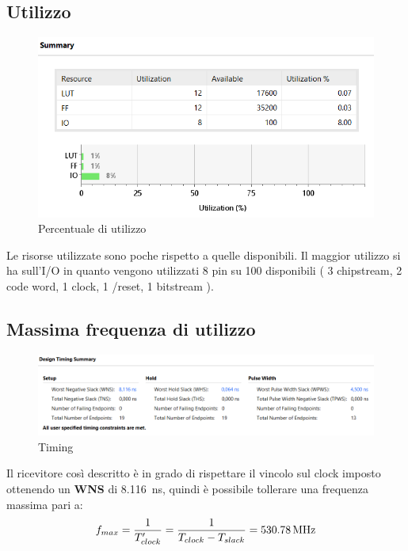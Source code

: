 \documentclass[a4paper,12pt]{article}
\begin{document}
  \subsection{Utilizzo}
    \begin{figure}[H]
      \centering
      \includegraphics[width=\textwidth]{img/Utilizzo.png}
      \caption{Percentuale di utilizzo}
      \label{fig:utilizzo}
    \end{figure}
    Le risorse utilizzate sono poche rispetto a quelle disponibili. Il maggior utilizzo si ha sull'I/O in quanto vengono 
    utilizzati 8 pin su 100 disponibili ( 3 chipstream, 2 code word, 1 clock, 1 /reset, 1 bitstream ).
  \subsection{Massima frequenza di utilizzo}
    \begin{figure}[H]
      \centering
      \includegraphics[width=\textwidth]{img/FrequenzaMassima.png}
      \caption{Timing}
      \label{fig:timing}
    \end{figure}
    Il ricevitore così descritto è in grado di rispettare il vincolo sul clock imposto ottenendo un \textbf{WNS} di \SI{8.116}{\nano\second},
    quindi è possibile tollerare una frequenza massima pari a:
    $$ f_{max} = \frac{1}{T'_{clock}} = \frac{1}{T_{clock}-T_{slack}} =  \text{\SI{530.78}{\mega\hertz}} $$  
\end{document}

